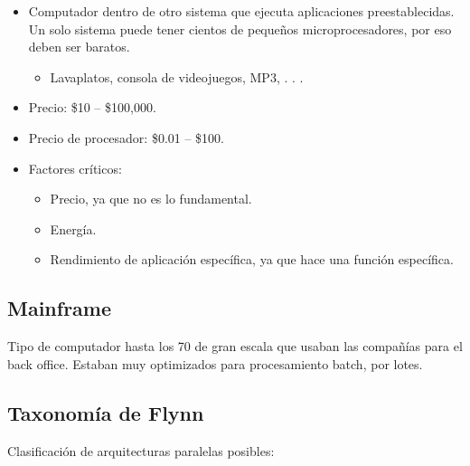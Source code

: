 \documentclass[12pt, twoside, openright]{report} %
\begin{document}
    \begin{itemize}
    
    \item
      Computador dentro de otro sistema que ejecuta aplicaciones
      preestablecidas. Un solo sistema puede tener cientos de pequeños
      microprocesadores, por eso deben ser baratos.

      \begin{itemize}
      
      \item
        Lavaplatos, consola de videojuegos, MP3, . . .
      \end{itemize}
    \item
      Precio: \$10 -- \$100,000.
    \item
      Precio de procesador: \$0.01 -- \$100.
    \item
      Factores críticos:

      \begin{itemize}
      
      \item
        Precio, ya que no es lo fundamental.
      \item
        Energía.
      \item
        Rendimiento de aplicación específica, ya que hace una función
        específica.
      \end{itemize}
    \end{itemize}
  \pagebreak
  \subsection{Mainframe}

  Tipo de computador hasta los 70 de gran escala que usaban las
  compañías para el back office. Estaban muy optimizados para
  procesamiento batch, por lotes.

  \subsection{Taxonomía de Flynn}

  Clasificación de arquitecturas paralelas posibles:
\end{document}
